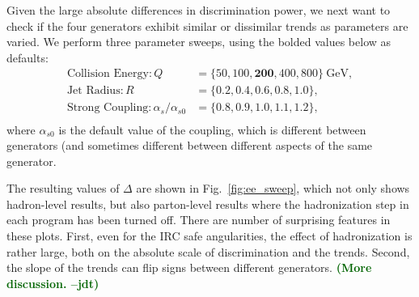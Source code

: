 \documentclass[11pt,letterpaper]{article}
\newcommand{\GeV}{\text{GeV}}
\DeclareRobustCommand{\Fig}[1]{Fig.~\ref{#1}}
\newcommand{\be}{\begin{equation}}
\newcommand{\ee}{\end{equation}}
\newcommand{\jdt}[1]{\textbf{\textcolor{darkgreen}{(#1 --jdt)}}}
\begin{document}
Given the large absolute differences in discrimination power, we next want to check if the four generators exhibit similar or dissimilar trends as parameters are varied.  We perform three parameter sweeps, using the bolded values below as defaults:
\be
\begin{aligned}
\text{Collision Energy}: Q &= \{ 50, 100, \mathbf{200}, 400, 800\}~\GeV, \\
\text{Jet Radius}: R &= \{ 0.2, 0.4, \mathbf{0.6}, 0.8, 1.0\}, \\
\text{Strong Coupling}: \alpha_s / \alpha_{s0} &= \{0.8,0.9,\mathbf{1.0},1.1,1.2\}, \\
\end{aligned}
\ee
where $\alpha_{s0}$ is the default value of the coupling, which is different between generators (and sometimes different between different aspects of the same generator.

The resulting values of $\Delta$ are shown in \Fig{fig:ee_sweep}, which not only shows hadron-level results, but also parton-level results where the hadronization step in each program has been turned off.  There are number of surprising features in these plots.  First, even for the IRC safe angularities, the effect of hadronization is rather large, both on the absolute scale of discrimination and the trends.  Second, the slope of the trends can flip signs between different generators.  \jdt{More discussion.}
\end{document}
